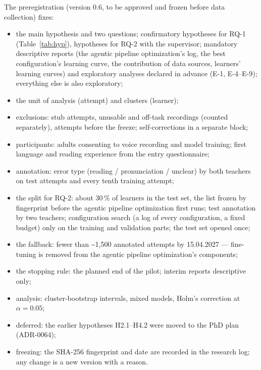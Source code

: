 The preregistration (version 0.6, to be approved and frozen before data collection) fixes:
\begin{itemize}
  \item the main hypothesis and two questions; confirmatory hypotheses for RQ-1 (Table~\ref{tab:hyp}), hypotheses for RQ-2 with the supervisor; mandatory descriptive reports (the
    agentic pipeline optimization's log, the best configuration's learning curve, the contribution of data sources, learners'
    learning curves) and exploratory analyses declared in
    advance (E-1, E-4--E-9); everything else is also exploratory;
  \item the unit of analysis (attempt) and clusters (learner);
  \item exclusions: stub attempts, unusable and off-task recordings (counted separately), attempts before the
    freeze; self-corrections in a separate block;
  \item participants: adults consenting to voice recording and model training; first language and
    reading experience from the entry questionnaire;
  \item annotation: error type (reading / pronunciation / unclear) by both teachers on test attempts and every
    tenth training attempt;
  \item the split for RQ-2: about 30\,\% of learners in the test set, the list frozen by fingerprint before the
    agentic pipeline optimization first runs; test annotation by two teachers; configuration search (a log of every configuration, a fixed budget) only on the training and validation parts; the test set
    opened once;
  \item the fallback: fewer than \textasciitilde1{,}500 annotated attempts by 15.04.2027 --- fine-tuning is
    removed from the agentic pipeline optimization's components;
  \item the stopping rule: the planned end of the pilot; interim reports descriptive only;
  \item analysis: cluster-bootstrap intervals, mixed models, Holm's correction at $\alpha=0.05$;
  \item deferred: the earlier hypotheses H2.1--H4.2 were moved to the PhD plan (ADR-0064);
  \item freezing: the SHA-256 fingerprint and date are recorded in the research log; any change is a new
    version with a reason.
\end{itemize}
